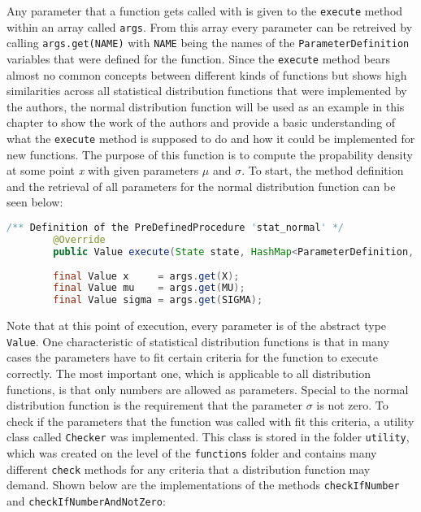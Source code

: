 Any parameter that a function gets called with is given to the \lstinline{execute} method within an array called \lstinline{args}. From this array every parameter can be retreived by calling \lstinline{args.get(NAME)} with \lstinline{NAME} being the names of the \lstinline{ParameterDefinition} variables that were defined for the function. Since the \lstinline{execute} 
method bears almost no common concepts between different kinds of functions but shows high similarities across all statistical distribution functions that were implemented by the authors, the normal distribution function will be used as an example in this chapter to show the work of the authors and provide a basic understanding of what the \lstinline{execute} method is supposed to do and how it could be implemented for new functions. The purpose of this function is to compute the propability density at some point \textit{x} with given parameters $\mu$ and $\sigma$. To start, the method definition and the retrieval of all parameters for the normal distribution function can be seen below:

\begin{center}
	\begin{lstlisting}[caption={execute method and parameter retrieval}, language={java}, label=lis:parameterRetrieval]
		/** Definition of the PreDefinedProcedure 'stat_normal' */
		@Override
		public Value execute(State state, HashMap<ParameterDefinition, Value> args) throws SetlException {
		
        final Value x     = args.get(X);
        final Value mu    = args.get(MU);
        final Value sigma = args.get(SIGMA);
	\end{lstlisting}
\end{center}

 Note that at this point of execution, every parameter is of the abstract type \lstinline{Value}. One characteristic of statistical distribution functions is that in many cases the parameters have to fit certain criteria for the function to execute correctly. The most important one, which is applicable to all distribution functions, is that only numbers are allowed as parameters. Special to the normal distribution function is the requirement that the parameter $\sigma$ is not zero. To check if the parameters that the function was called with fit this criteria, a utility class called \lstinline{Checker} was implemented. This class is stored in the folder \lstinline{utility}, which was created on the level of the \lstinline{functions} folder and contains many different \lstinline{check} methods for any criteria that a distribution function may demand. Shown below are the implementations of the methods \lstinline{checkIfNumber} and \lstinline{checkIfNumberAndNotZero}:
 
